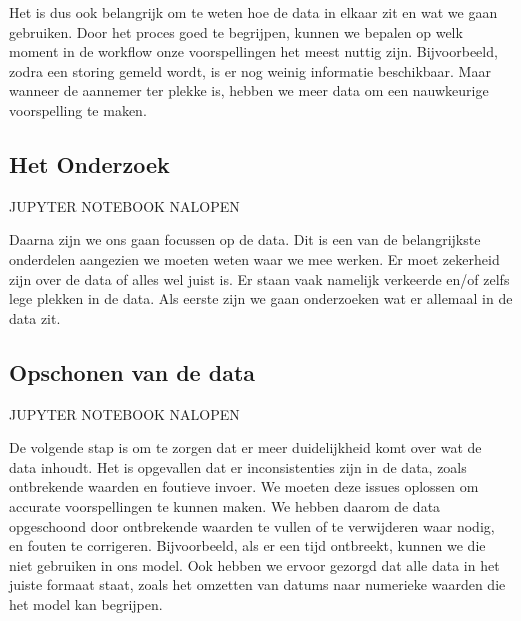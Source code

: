 \documentclass{article}
\begin{document}
Het is dus ook belangrijk om te weten hoe de data in elkaar zit en wat we gaan gebruiken. Door het proces goed te begrijpen, kunnen we bepalen op welk moment in de workflow onze voorspellingen het meest nuttig zijn. Bijvoorbeeld, zodra een storing gemeld wordt, is er nog weinig informatie beschikbaar. Maar wanneer de aannemer ter plekke is, hebben we meer data om een nauwkeurige voorspelling te maken.

\subsection{Het Onderzoek}
JUPYTER NOTEBOOK NALOPEN

Daarna zijn we ons gaan focussen op de data. Dit is een van de belangrijkste onderdelen aangezien we moeten weten waar we mee werken. Er moet zekerheid zijn over de data of alles wel juist is. Er staan vaak namelijk verkeerde en/of zelfs lege plekken in de data. Als eerste zijn we gaan onderzoeken wat er allemaal in de data zit.

\subsection{Opschonen van de data}
JUPYTER NOTEBOOK NALOPEN

De volgende stap is om te zorgen dat er meer duidelijkheid komt over wat de data inhoudt. Het is opgevallen dat er inconsistenties zijn in de data, zoals ontbrekende waarden en foutieve invoer. We moeten deze issues oplossen om accurate voorspellingen te kunnen maken. We hebben daarom de data opgeschoond door ontbrekende waarden te vullen of te verwijderen waar nodig, en fouten te corrigeren. Bijvoorbeeld, als er een tijd ontbreekt, kunnen we die niet gebruiken in ons model. Ook hebben we ervoor gezorgd dat alle data in het juiste formaat staat, zoals het omzetten van datums naar numerieke waarden die het model kan begrijpen.
\end{document}
